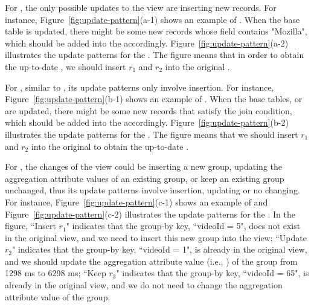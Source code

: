 For \spview, the only possible updates to the view are inserting new records.  
For instance, Figure~\ref{fig:update-pattern}(a-1) shows an example of \spview. When the base table  is updated, there might be some new records whose  field contains "Mozilla", which should be added into the \spview accordingly. Figure~\ref{fig:update-pattern}(a-2) illustrates the update patterns for the \spview. The figure means that in order to obtain the up-to-date \spview, we should insert $r_1$ and $r_2$ into the original \spview.

For \fjview, similar to \spview, its update patterns only involve insertion. For instance, Figure~\ref{fig:update-pattern}(b-1) shows an example of \fjview. When the base tables,  or  are updated, there might be some new records that satisfy the join condition, which should be added into the \fjview accordingly. Figure~\ref{fig:update-pattern}(b-2) illustrates the update patterns for the \fjview. The figure means that we should insert $r_1$ and $r_2$ into the original \fjview to obtain the up-to-date \fjview.

For \aggview, the changes of the view could be inserting a new group, updating the aggregation attribute values of an existing group, or keep an existing group unchanged, thus its update patterns involve insertion, updating or no changing. 
For instance, Figure~\ref{fig:update-pattern}(c-1) shows an example of \aggview and Figure~\ref{fig:update-pattern}(c-2) illustrates the update patterns for the \aggview. In the figure, ``Insert $r_1$" indicates that the group-by key, ``videoId = 5", does not exist in the original view, and we need to insert this new group into the view; ``Update $r_2$" indicates that the group-by key, ``videoId = 1", is already in the original view, and we should update the aggregation attribute value (i.e., ) of the group from 1298 ms to 6298 ms; ``Keep $r_3$" indicates that the group-by key, ``videoId = 65", is already in the original  view, and we do not need to change the aggregation attribute value of the group.    

